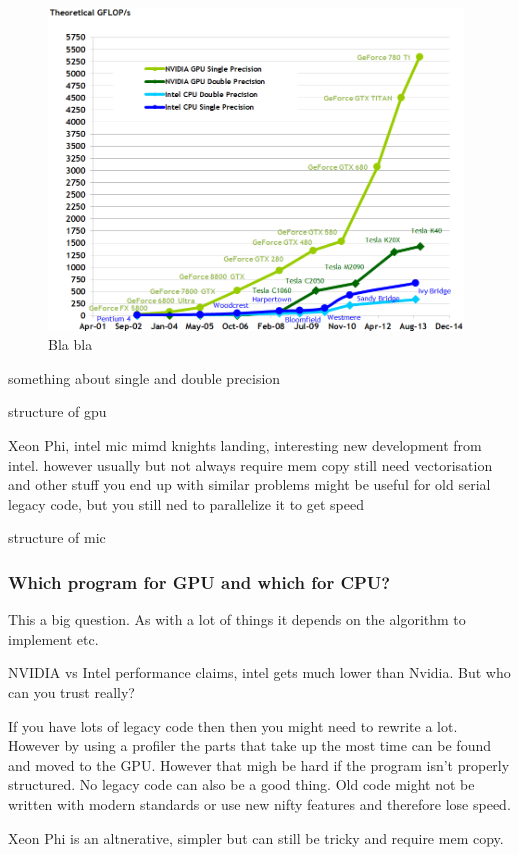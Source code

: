 \documentclass[10pt,a4paper]{article}
\begin{document}
\begin{figure}[h]
    \centering
    \includegraphics[width=11cm]{floating-point-operations-per-second.png}
    \caption{Bla bla \cite{cuda}}
    \label{fig:gpu_vs_cpu}
\end{figure}

something about single and double precision

structure of gpu

Xeon Phi, intel mic
mimd
knights landing, interesting new development from intel.
however usually but not always require mem copy
still need vectorisation and other stuff
you end up with similar problems
might be useful for old serial legacy code, but you still ned to parallelize it to get speed

structure of mic

\subsubsection{Which program for GPU and which for CPU?}
\label{gpu_gwas}
This a big question. As with a lot of things it depends on the algorithm to implement etc.

NVIDIA vs Intel performance claims, intel gets much lower than Nvidia. But who can you trust really?

If you have lots of legacy code then then you might need to rewrite a lot. However by using a profiler the parts that take up the most time can be found and moved to the GPU. However that migh be hard if the program isn't properly structured. No legacy code can also be a good thing. Old code might not be written with modern standards or use new nifty features and therefore lose speed.

Xeon Phi is an altnerative, simpler but can still be tricky and require mem copy.
\end{document}
